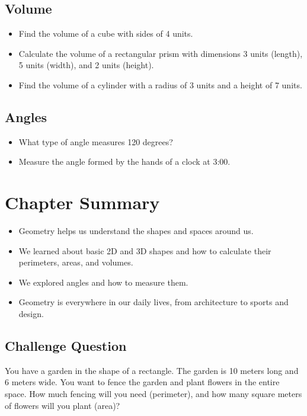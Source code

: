 \subsection{Volume}
\begin{itemize}
    \item Find the volume of a cube with sides of 4 units.
    \item Calculate the volume of a rectangular prism with dimensions 3 units (length), 5 units (width), and 2 units (height).
    \item Find the volume of a cylinder with a radius of 3 units and a height of 7 units.
\end{itemize}

\subsection{Angles}
\begin{itemize}
    \item What type of angle measures 120 degrees?
    \item Measure the angle formed by the hands of a clock at 3:00.
\end{itemize}

\section{Chapter Summary}
\begin{itemize}
    \item Geometry helps us understand the shapes and spaces around us.
    \item We learned about basic 2D and 3D shapes and how to calculate their perimeters, areas, and volumes.
    \item We explored angles and how to measure them.
    \item Geometry is everywhere in our daily lives, from architecture to sports and design.
\end{itemize}

\subsection{Challenge Question}
You have a garden in the shape of a rectangle. The garden is 10 meters long and 6 meters wide. You want to fence the garden and plant flowers in the entire space. How much fencing will you need (perimeter), and how many square meters of flowers will you plant (area)?


